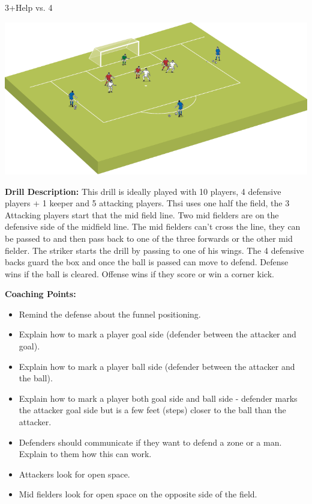 \begin{evenBlock}{3+Help vs. 4}

\begin{minipage}[t]{\linewidth}
    \centering
    
    \begin{minipage}{.3\linewidth} %
        \includegraphics[width=\textwidth]{../img/Trimmed/SecureTheBox1}
    \end{minipage}
    \hspace{0.05\linewidth}
    \begin{minipage}{.6\linewidth} %
        \textbf{Drill Description:}
        This drill is ideally played with 10 players, 4 defensive players + 1 keeper and 5 attacking players.  Thsi uses one half the field, the 3 Attacking players start that the mid field line.  Two mid fielders are on the defensive side of the midfield line.  The mid fielders can't cross the line, they can be passed to and then pass back to one of the three forwards or the other mid fielder.  The striker starts the drill by passing to one of his wings.  The 4 defensive backs guard the box and once the ball is passed can move to defend.  Defense wins if the ball is cleared.  Offense wins if they score or win a corner kick.
        
        \textbf{Coaching Points:}
        \begin{itemize}
            \setlength{\itemsep}{0pt}
            \setlength{\parskip}{0pt}
            \setlength{\parsep}{0pt}
            \item Remind the defense about the funnel positioning.
            \item Explain how to mark a player goal side (defender between the attacker and goal).
            \item Explain how to mark a player ball side (defender between the attacker and the ball).
            \item Explain how to mark a player both goal side and ball side - defender marks the attacker goal side but is a few feet (steps) closer to the ball than the attacker.
            \item Defenders should communicate if they want to defend a zone or a man.  Explain to them how this can work.
            \item Attackers look for open space.
            \item Mid fielders look for open space on the opposite side of the field.
        \end{itemize}


\end{minipage}
\end{minipage}
\end{evenBlock}
